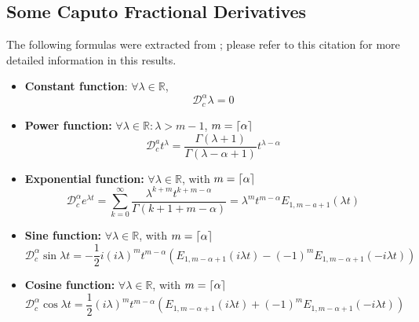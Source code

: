     \subsection{Some Caputo Fractional Derivatives}
    The following formulas were extracted from \cite{ishteva2005properties}; please refer to this citation for more detailed information in this results.
    \begin{itemize}
        \item \textbf{Constant function}: $\forall \lambda\in\mathbb{R}$, \begin{equation}
            \mathcal{D}_c^\alpha \lambda = 0
        \end{equation}
        \item \textbf{Power function:} $\forall \lambda\in\mathbb{R}:\lambda>m-1$, $m = \lceil\alpha\rceil$
        \begin{equation}
            \mathcal{D} _ { c } ^ { a } t ^ { \lambda } = \dfrac { \Gamma ( \lambda + 1 ) } { \Gamma ( \lambda - \alpha + 1 ) } t ^ { \lambda - \alpha }
        \end{equation}
        \item \textbf{Exponential function:} $\forall\lambda\in\mathbb{R}$, with $m = \lceil\alpha\rceil$
        \begin{equation}
            \mathcal{D} _ {c } ^ { \alpha } e ^ { \lambda t } = \sum _ { k = 0 } ^ { \infty } \frac { \lambda ^ { k + m } t ^ { k + m - \alpha } } { \Gamma ( k + 1 + m - \alpha ) } = \lambda ^ { m } t ^ { m - \alpha } E _ { 1 , m - a + 1 } ( \lambda t )
        \end{equation}
    \item \textbf{Sine function: }$\forall\lambda\in\mathbb{R}$, with $m = \lceil\alpha\rceil$
        \begin{equation}
            \mathcal{D} _ { c } ^ { \alpha } \sin \lambda t = - \frac { 1 } { 2 } i ( i \lambda ) ^ { m } t ^ { m - \alpha } \left( E _ { 1 , m - \alpha + 1 } ( i \lambda t ) - ( - 1 ) ^ { m } E _ { 1 , m - \alpha + 1 } ( - i \lambda t ) \right)
        \end{equation}
        \item \textbf{Cosine function: }$\forall\lambda\in\mathbb{R}$, with $m = \lceil\alpha\rceil$
        \begin{equation}
            \mathcal{D} _ { c } ^ { \alpha } \cos \lambda t = \frac { 1 } { 2 } ( i \lambda ) ^ { m } t ^ { m - \alpha } \left( E _ { 1 , m - \alpha + 1 } ( i \lambda t ) + ( - 1 ) ^ { m } E _ { 1 , m - \alpha + 1 } ( - i \lambda t ) \right)
        \end{equation}
    \end{itemize}
